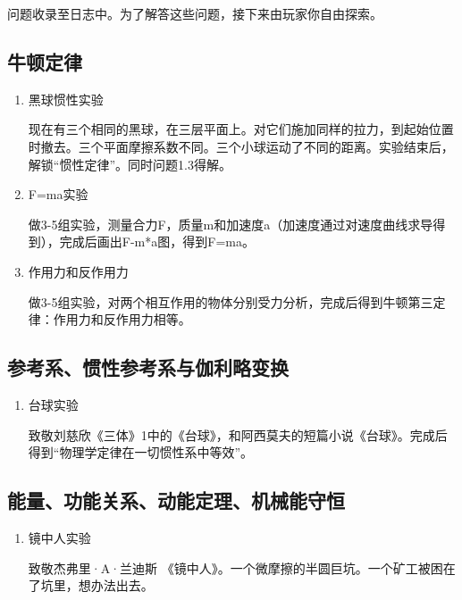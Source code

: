 \documentclass{tstextbook}
\begin{document}
问题收录至日志中。为了解答这些问题，接下来由玩家你自由探索。

\subsection{牛顿定律}

\begin{enumerate}

\item{黑球惯性实验}

现在有三个相同的黑球，在三层平面上。对它们施加同样的拉力，到起始位置时撤去。三个平面摩擦系数不同。三个小球运动了不同的距离。实验结束后，解锁“惯性定律”。同时问题1.3得解。

\item{F=ma实验}

做3-5组实验，测量合力F，质量m和加速度a（加速度通过对速度曲线求导得到），完成后画出F-m*a图，得到F=ma。

\item{作用力和反作用力}

做3-5组实验，对两个相互作用的物体分别受力分析，完成后得到牛顿第三定律：作用力和反作用力相等。

\end{enumerate}

\subsection{参考系、惯性参考系与伽利略变换}

\begin{enumerate}

\item{台球实验}

致敬刘慈欣《三体》1中的《台球》，和阿西莫夫的短篇小说《台球》。完成后得到“物理学定律在一切惯性系中等效”。

\end{enumerate}

\subsection{能量、功能关系、动能定理、机械能守恒}

\begin{enumerate}

\item{镜中人实验}

致敬杰弗里·A·兰迪斯 《镜中人》。一个微摩擦的半圆巨坑。一个矿工被困在了坑里，想办法出去。

\end{enumerate}


\printbibliography{}


\printindex
\end{document}
